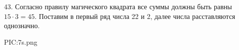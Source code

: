 43. Согласно правилу магического квадрата все суммы должны быть равны $15\cdot3=45.$ Поставим в первый ряд числа 22 и 2, далее числа расставляются однозначно.
\begin{center}
{{PIC:7s.png}}
\end{center}
